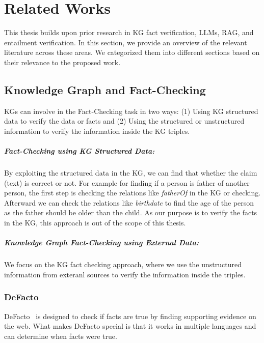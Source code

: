 \chapter{Related Works}\label{ch:related_works}
This thesis builds upon prior research in \ac{KG} fact verification, \ac{LLMs}, \ac{RAG}, and entailment verification.
In this section, we provide an overview of the relevant literature across these areas.
We categorized them into different sections based on their relevance to the proposed work.

\section{Knowledge Graph and Fact-Checking}\label{sec:knowledge-graph-fact-verification}
\acp{KG} can involve in the Fact-Checking task in two ways:
(1) Using KG structured data to verify the data or facts
and (2) Using the structured or unstructured information to verify the information inside the KG triples.
\paragraph{Fact-Checking using KG Structured Data:}
By exploiting the structured data in the KG, we can find that whether the claim (\ie text) is correct or not.
For example for finding if a person is father of another person, the first step is checking the relations like \textit{fatherOf} in the KG or checking.
Afterward we can check the relations like \textit{birthdate} to find the age of the person as the father should be older than the child.
As our purpose is to verify the facts in the KG, this approach is out of the scope of this thesis.

\paragraph{Knowledge Graph Fact-Checking using External Data:}
We focus on the KG fact checking approach, where we use the unstructured information from exteranl sources to verify the information inside the triples.

\subsection{DeFacto}\label{subsec:defacto}
DeFacto~\cite{GERBER201585} is designed to check if facts are true by finding supporting evidence on the web.
What makes DeFacto special is that it works in multiple languages and can determine when facts were true.

